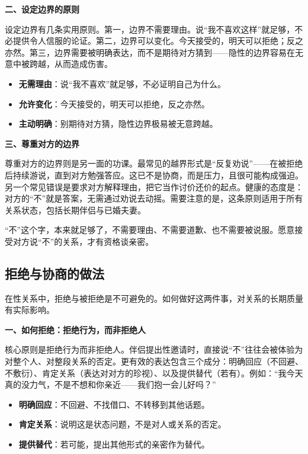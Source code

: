 \documentclass[12pt,UTF8]{ctexbook}
\begin{document}
\textbf{二、设定边界的原则}

设定边界有几条实用原则。第一，边界不需要理由。说“我不喜欢这样”就足够，不必提供令人信服的论证。第二，边界可以变化。今天接受的，明天可以拒绝；反之亦然。第三，边界需要被明确表达，而不是期待对方猜到——隐性的边界容易在无意中被跨越，从而造成伤害。

\begin{itemize}
\item \textbf{无需理由}：说“我不喜欢”就足够，不必证明自己为什么。
\item \textbf{允许变化}：今天接受的，明天可以拒绝，反之亦然。
\item \textbf{主动明确}：别期待对方猜，隐性边界极易被无意跨越。
\end{itemize}

\textbf{三、尊重对方的边界}

尊重对方的边界则是另一面的功课。最常见的越界形式是“反复劝说”——在被拒绝后持续游说，直到对方勉强答应。这已不是协商，而是压力，且很可能构成强迫。另一个常见错误是要求对方解释理由，把它当作讨价还价的起点。健康的态度是：对方的“不”就是答案，无需通过劝说去动摇。需要注意的是，这条原则适用于所有关系状态，包括长期伴侣与已婚夫妻。

\begin{tcolorbox}[colback=pink!5!white,colframe=red!50!black,title=贴心小叮咛]
“不”这个字，本来就足够了，不需要理由、不需要道歉、也不需要被说服。愿意接受对方说“不”的关系，才有资格谈亲密。
\end{tcolorbox}

\subsection{拒绝与协商的做法}

在性关系中，拒绝与被拒绝是不可避免的。如何做好这两件事，对关系的长期质量有实际影响。

\textbf{一、如何拒绝：拒绝行为，而非拒绝人}

核心原则是拒绝行为而非拒绝人。伴侣提出性邀请时，直接说“不”往往会被体验为对整个人、对整段关系的否定。更有效的表达包含三个成分：明确回应（不回避、不敷衍）、肯定关系（表达对对方的珍视）、以及提供替代（若有）。例如：“我今天真的没力气，不是不想和你亲近——我们抱一会儿好吗？”

\begin{itemize}
\item \textbf{明确回应}：不回避、不找借口、不转移到其他话题。
\item \textbf{肯定关系}：说明这是状态问题，不是对人或关系的否定。
\item \textbf{提供替代}：若可能，提出其他形式的亲密作为替代。
\end{itemize}
\end{document}
